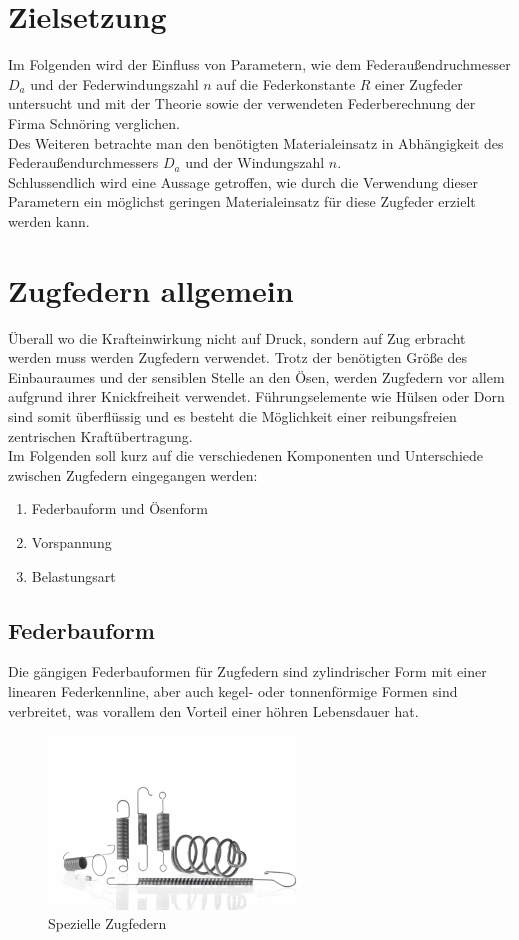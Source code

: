 \newpage
\section*{Zielsetzung}
Im Folgenden wird der Einfluss von Parametern, wie dem Federaußendruchmesser $D_a$
und der Federwindungszahl $n$ auf die Federkonstante $R$ einer Zugfeder untersucht
und mit der Theorie sowie der verwendeten Federberechnung der Firma Schnöring verglichen.\\

Des Weiteren betrachte man den benötigten Materialeinsatz in Abhängigkeit des Federaußendurchmessers $D_a$ und 
der Windungszahl $n$.\\
Schlussendlich wird eine Aussage getroffen, wie durch die Verwendung dieser Parametern 
ein möglichst geringen Materialeinsatz für diese Zugfeder erzielt werden kann.  

 

\section{Zugfedern allgemein}
Überall wo die Krafteinwirkung nicht auf Druck, sondern auf Zug erbracht werden muss
werden Zugfedern verwendet. Trotz der benötigten Größe des Einbauraumes und der sensiblen
Stelle an den Ösen, werden Zugfedern vor allem aufgrund ihrer Knickfreiheit verwendet.
Führungselemente wie Hülsen oder Dorn sind somit überflüssig und es besteht die Möglichkeit
einer reibungsfreien zentrischen Kraftübertragung.\\
Im Folgenden soll kurz auf die verschiedenen Komponenten und Unterschiede zwischen
Zugfedern eingegangen werden:
\begin{enumerate}
    \item Federbauform und Ösenform
    \item Vorspannung
    \item Belastungsart
\end{enumerate}



\subsection{Federbauform}
Die gängigen Federbauformen für Zugfedern sind zylindrischer Form mit einer linearen
Federkennline, aber auch kegel- oder tonnenförmige Formen sind verbreitet, was vorallem
den Vorteil einer höhren Lebensdauer hat.
\begin{figure}[H]
    \centering
    \includegraphics[width=0.6\textwidth]{bilder/Input/zugfedern_spezial.jpg}
    \caption{Spezielle Zugfedern \cite{KompZ}}
\end{figure}



